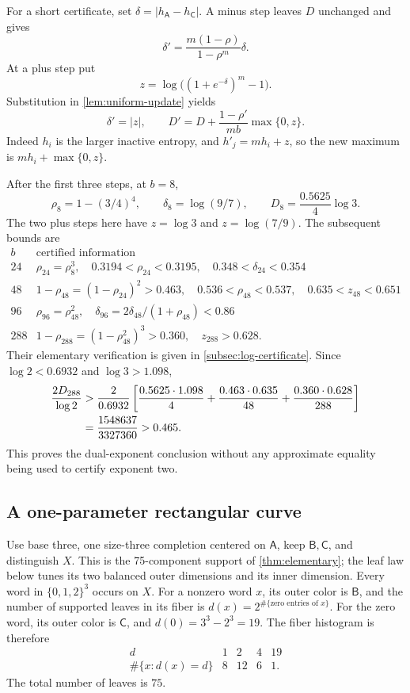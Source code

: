 \documentclass[11pt]{article}
\numberwithin{equation}{section}
\theoremstyle{definition}
\theoremstyle{remark}
\newcommand{\colA}{\mathsf A}
\newcommand{\colB}{\mathsf B}
\newcommand{\colC}{\mathsf C}
\begin{document}
For a short certificate, set
\(\delta=|h_{\colA}-h_{\colC}|\).
A minus step leaves \(D\) unchanged and gives
\[
 \delta'=\frac{m(1-\rho)}{1-\rho^m}\delta.
\]
At a plus step put
\[
 z=\log\bigl((1+e^{-\delta})^m-1\bigr).
\]
Substitution in \cref{lem:uniform-update} yields
\begin{equation}\label{eq:delta-D}
 \delta'=|z|,\qquad
 D'=D+\frac{1-\rho'}{mb}\max\{0,z\}.
\end{equation}
Indeed \(h_i\) is the larger inactive entropy, and
\(h'_j=mh_i+z\), so the new maximum is
\(mh_i+\max\{0,z\}\).

After the first three steps, at \(b=8\),
\[
 \rho_8=1-(3/4)^4,\qquad
 \delta_8=\log(9/7),\qquad
 D_8=\frac{0.5625}{4}\log3.
\]
The two plus steps here have \(z=\log3\) and \(z=\log(7/9)\).
The subsequent bounds are
\[
\begin{array}{c|l}
 b&\text{certified information}\\ \hline
24&
 \rho_{24}=\rho_8^3,\quad
 0.3194<\rho_{24}<0.3195,\quad
 0.348<\delta_{24}<0.354\\
48&
 1-\rho_{48}=(1-\rho_{24})^2>0.463,\quad
 0.536<\rho_{48}<0.537,\quad 0.635<z_{48}<0.651\\
96&
 \rho_{96}=\rho_{48}^2,\quad
 \delta_{96}=2\delta_{48}/(1+\rho_{48})<0.86\\
288&
 1-\rho_{288}=(1-\rho_{48}^2)^3>0.360,\quad z_{288}>0.628.
\end{array}
\]
Their elementary verification is given in \cref{subsec:log-certificate}.
Since \(\log2<0.6932\) and \(\log3>1.098\),
\begin{align}
 \frac{2D_{288}}{\log2}
 &>
 \frac{2}{0.6932}
 \left[
  \frac{0.5625\cdot1.098}{4}
  +\frac{0.463\cdot0.635}{48}
  +\frac{0.360\cdot0.628}{288}
 \right]\notag\\
 &=\frac{1548637}{3327360}>0.465. \label{eq:alpha-rational}
\end{align}
This proves the dual-exponent conclusion without any approximate
equality being used to certify exponent two.

\subsection{A one-parameter rectangular curve}\label{subsec:curve}

Use base three, one size-three completion centered on \(\colA\),
keep \(\colB,\colC\), and distinguish \(X\).
This is the 75-component support of \cref{thm:elementary}; the leaf
law below tunes its two balanced outer dimensions and its inner dimension.
Every word in \(\{0,1,2\}^3\) occurs on \(X\).
For a nonzero word \(x\), its outer color is \(\colB\), and the number
of supported leaves in its fiber is
\(d(x)=2^{\#\{\text{zero entries of }x\}}\).
For the zero word, its outer color is \(\colC\), and
\(d(0)=3^3-2^3=19\).
The fiber histogram is therefore
\[
\begin{array}{c|rrrr}
 d&1&2&4&19\\ \hline
 \#\{x:d(x)=d\}&8&12&6&1.
\end{array}
\]
The total number of leaves is \(75\).
\end{document}

